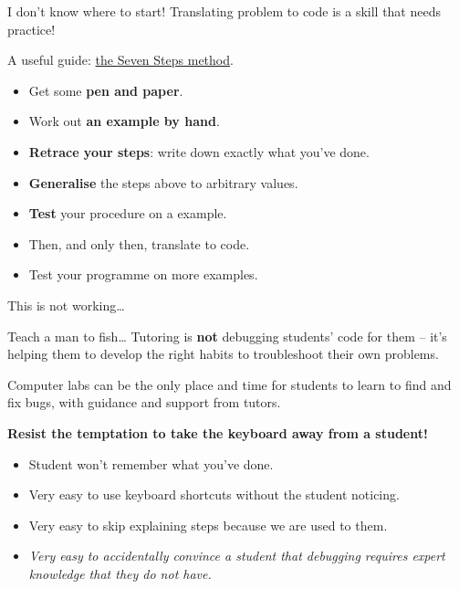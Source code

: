 \documentclass[10pt]{beamer}
\begin{document}
\begin{frame}{I don't know where to start!}
    Translating problem to code is a skill that needs practice!
    \pause

    A useful guide: \href{https://adhilton.pratt.duke.edu/sites/adhilton.pratt.duke.edu/files/u37/iticse-7steps.pdf}{the \alert{Seven Steps} method}.
    \begin{itemize}[<+->]
        \item Get some \textbf{pen and paper}.
        \item Work out \textbf{an example by hand}.
        \item \textbf{Retrace your steps}: write down exactly what you've done.
        \item \textbf{Generalise} the steps above to arbitrary values.
        \item \textbf{Test} your procedure on a  example.
        \item Then, and \alert{only} then, translate to code.
        \item Test your programme on more examples.
    \end{itemize}
\end{frame}

\begin{frame}{This is not working\ldots}
    \begin{exampleblock}{Teach a man to fish\ldots}
        Tutoring is \textbf{not} debugging students' code for them -- it's helping them to develop the right habits to troubleshoot their own problems.

        Computer labs can be the only place and time for students to learn to find and fix bugs, with guidance and support from tutors.
    \end{exampleblock}
    \pause
    \textbf{Resist the temptation to take the keyboard away from a student!}
    
    \begin{itemize}
        \item Student won't remember what you've done.
        \item Very easy to use keyboard shortcuts without the student noticing.
        \item Very easy to skip explaining steps because we are used to them.
        \item \alert{\emph{Very easy to accidentally convince a student that debugging requires expert knowledge that they do not have.}}
    \end{itemize}
\end{frame}
\end{document}
